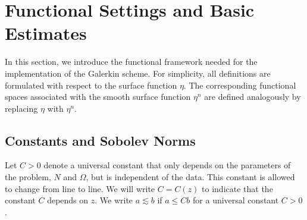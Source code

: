 \documentclass[letterpaper,reqno,10pt,twoside]{amsart}
\theoremstyle{definition}
\theoremstyle{remark}
\def\Om{\Omega}
\def\dive{\mathop{\rm div}\nolimits}
\begin{document}
	
	
	
	
	
	\section{Functional Settings and Basic Estimates} \label{appendix_spaces}
	
	In this section, we introduce the functional framework needed for the implementation of the Galerkin scheme. For simplicity, all definitions are formulated with respect to the surface function 
	$\eta$. The corresponding functional spaces associated with the smooth surface function 
	$\eta^{n}$
	are defined analogously by replacing $\eta$ with $\eta^{n}$.
	
	
	\subsection{Constants and Sobolev Norms}\label{sec:notation}
	
	
	Let $C>0$ denote a universal constant that only depends on the parameters of the problem, $N$ and $\Om$, but is independent of the data. This constant is allowed to change from line to line. We will write $C=C(z)$ to indicate that the constant $C$ depends on $z$. We write $a\lesssim b$ if $a\le C b$ for a universal constant $C>0$.
	
\end{document}
